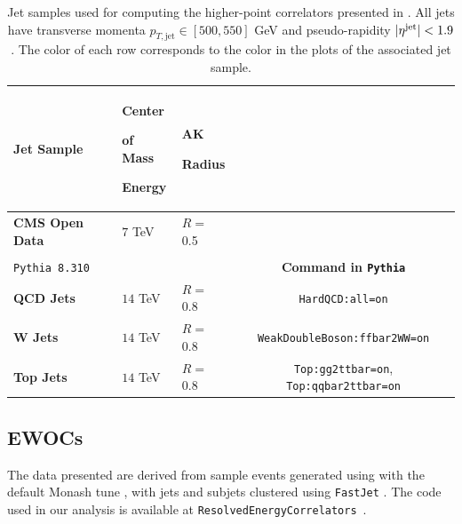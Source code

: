 \begin{subappendices}
\begin{table}[ht!]
    \vspace{10pt}
    \centering
    \begin{tabular}{>{\centering\arraybackslash}p{1.9cm}p{1.6cm}p{1.8cm}c@{}}
        \toprule
    \textbf{Jet Sample} & \textbf{Center} \par \textbf{of Mass} \par \textbf{Energy} & \textbf{AK} \par \textbf{Radius}
        \\
        \midrule
        \rowcolor{orange!85!purple!40}
        \textbf{CMS Open Data} & \(7\) TeV & \(R=\,\)0.5
        \\
        \\
        \midrule
        \texttt{Pythia 8.310} & & & \textbf{Command in \texttt{Pythia}}\\
        \midrule
        \rowcolor{blue!50!green!15}
        \textbf{QCD Jets} & \(14\) TeV & \(R=\,\)0.8 & \texttt{HardQCD:all=on} \\
        \midrule
        \rowcolor{pink!50}
        \textbf{\(\boldsymbol{W}\) Jets} & \(14\) TeV & \(R=\,\)0.8 & \texttt{WeakDoubleBoson:ffbar2WW=on} \\
        \midrule
        \rowcolor{yellow!40}
        \textbf{Top Jets} & \(14\) TeV & \(R=\,\)0.8 & \texttt{Top:gg2ttbar=on}, \texttt{Top:qqbar2ttbar=on} \\
        \bottomrule
    \end{tabular}
    \caption[Jet samples used for computing higher-point energy correlators in this thesis.]{Jet samples used for computing the higher-point correlators presented in .
    All jets %
    have transverse momenta $p_{T,\text{jet}} \in [500, 550]$ GeV and pseudo-rapidity $\vert \eta^{\rm jet} \vert < 1.9$.
    The color of each row corresponds to the color in the plots of the associated jet sample.
    \label{tab:samples}
    }
\end{table}


\subsection{EWOCs}
The data presented  are derived from sample events generated using \pythia{} \cite{Bierlich:2022pfr} with the default Monash tune \cite{Skands:2014pea}, with jets and subjets clustered using \texttt{FastJet} \cite{Cacciari:2011ma}.
%
The code used in our analysis is available at \texttt{ResolvedEnergyCorrelators}~\cite{Alipour-fard:2024szj,github:RENC}.


\end{subappendices}

